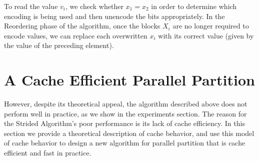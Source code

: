 \documentclass[sigconf]{acmart}
\theoremstyle{remark}
\theoremstyle{remark}
\begin{document}
To read the value $v_i$, we check whether $x_1 = x_2$ in order to
determine which encoding is being used and then unencode the bits
appropriately. In the Reordering phase of the algorithm, once the
blocks $X_i$ are no longer required to encode values, we can replace
each overwritten $x_i$ with its correct value (given by the value of
the preceding element).

\section{A Cache Efficient Parallel Partition}

However, despite its theoretical appeal, the algorithm described above does not perform well in practice, as we show in the experiments section. 
The reason for the Strided Algorithm's poor performance is its lack of cache efficiency. 
In this section we provide a theoretical description of cache behavior, and use this model of cache behavior to design a new algorithm for parallel partition that is cache efficient and fast in practice. 
\end{document}
